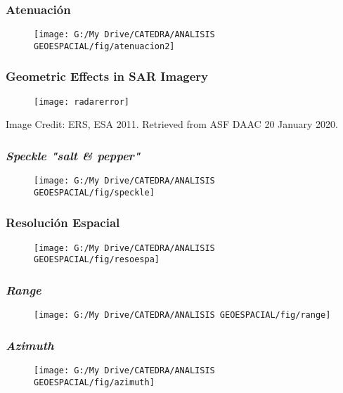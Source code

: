 \documentclass[14pt]{beamer}
\begin{document}
\begin{frame}
\frametitle{Atenuación}
 \begin{figure}
    \centering
    \texttt{[image: G:/My Drive/CATEDRA/ANALISIS GEOESPACIAL/fig/atenuacion2]}
  \end{figure}
\end{frame}
\begin{frame}
\frametitle{Geometric Effects in SAR Imagery}
 \begin{figure}
    \centering
    \texttt{[image: radarerror]}
  \end{figure}
\tiny{Image Credit: ERS, ESA 2011. Retrieved from ASF DAAC 20 January 2020.}
\end{frame}
\begin{frame}
\frametitle{\emph{Speckle "\emph{salt \& pepper}"}}
 \begin{figure}
    \centering
    \texttt{[image: G:/My Drive/CATEDRA/ANALISIS GEOESPACIAL/fig/speckle]}
  \end{figure}
\end{frame}
\begin{frame}
\frametitle{Resolución Espacial}
 \begin{figure}
    \centering
    \texttt{[image: G:/My Drive/CATEDRA/ANALISIS GEOESPACIAL/fig/resoespa]}
  \end{figure}
\end{frame}
\begin{frame}
\frametitle{\emph{Range}}
 \begin{figure}
    \centering
    \texttt{[image: G:/My Drive/CATEDRA/ANALISIS GEOESPACIAL/fig/range]}
  \end{figure}
\end{frame}
\begin{frame}
\frametitle{\emph{Azimuth}}
 \begin{figure}
    \centering
    \texttt{[image: G:/My Drive/CATEDRA/ANALISIS GEOESPACIAL/fig/azimuth]}
  \end{figure}
\end{frame}
\end{document}
